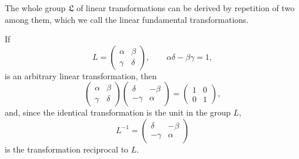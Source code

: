 \documentclass[11pt]{article}
\begin{document}
The whole group $\mathfrak L$ of linear transformations can be derived by repetition of two among them, which we call the linear fundamental transformations.

If
\[
L=\begin{pmatrix}\alpha&\beta\\\gamma&\delta\end{pmatrix},
\qquad \alpha\delta-\beta\gamma=1,
\]
is an arbitrary linear transformation, then
\begin{equation}
\begin{pmatrix}\alpha&\beta\\\gamma&\delta\end{pmatrix}
\begin{pmatrix}\delta&-\beta\\-\gamma&\alpha\end{pmatrix}
=\begin{pmatrix}1&0\\0&1\end{pmatrix}, \tag{1}
\end{equation}
and, since the identical transformation is the unit in the group $L$,
\[
L^{-1}=\begin{pmatrix}\delta&-\beta\\-\gamma&\alpha\end{pmatrix}
\]
is the transformation reciprocal to $L$.
\end{document}
